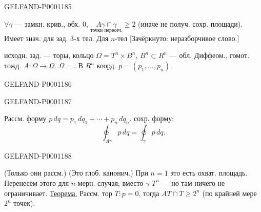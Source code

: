 \begin{GelfandAdjacentEvidence}{GELFAND-P000118}{5}

$\forall\gamma$ — замкн. крив., обх. $0$,
$\underset{\text{точки пересеч.}}{A\gamma\cap\gamma}\ge2$ (иначе не получ. сохр. площади).
Имеет знач. для зад. $3$-х тел.
Для $n$-тел [Зачёркнуто: неразборчивое слово.]

исходн. зад. — торы, кольцо
$\Omega=T^n\times B^n$, $B^n\subset R^n$ — обл.
Диффеом., гомот. тожд. $A:\Omega\longrightarrow\Omega$.
$\Omega={}$.
В $R^n$ коорд. $p=(p_1,\ldots,p_n)$.
\end{GelfandAdjacentEvidence}
\begin{GelfandAdjacentEvidence}{GELFAND-P000118}{6}


\end{GelfandAdjacentEvidence}
\begin{GelfandAdjacentEvidence}{GELFAND-P000118}{7}

Рассм. форму $p\,dq=p_1\,dq_1+\cdots+p_n\,dq_n$.
\noindent{} сохр. форму:
\begin{equation*}\oint_{A\gamma}p\,dq=\oint_\gamma p\,dq.\end{equation*}
\end{GelfandAdjacentEvidence}
\begin{GelfandAdjacentEvidence}{GELFAND-P000118}{8}

(Только они рассм.) (Это глоб. канонич.)
При $n=1$ это есть охват. площадь.
Перенесём этого для $n$-мерн. случая; вместо $\gamma$ $T^n$ —
но там ничего не ограничивает.
\underline{Теорема.} Рассм. тор $T:p=0$, тогда $AT\cap T\ge2^n$
(по крайней мере $2^n$ точек).
\end{GelfandAdjacentEvidence}
